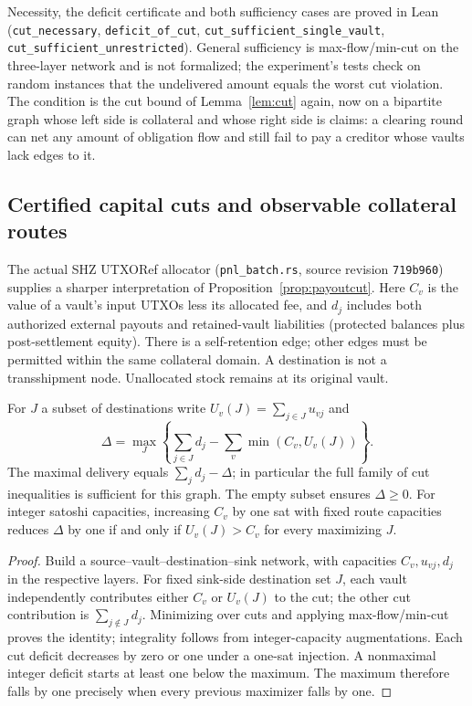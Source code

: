 {\sloppy Necessity, the deficit certificate and both sufficiency cases are proved in Lean (\texttt{cut\_\allowbreak{}necessary}, \texttt{deficit\_\allowbreak{}of\_\allowbreak{}cut}, \texttt{cut\_\allowbreak{}sufficient\_\allowbreak{}single\_\allowbreak{}vault}, \texttt{cut\_\allowbreak{}sufficient\_\allowbreak{}unrestricted}). General sufficiency is max-flow/min-cut \citep{fordfulkerson1956} on the three-layer network and is not formalized; the experiment's tests check on random instances that the undelivered amount equals the worst cut violation. The condition is the cut bound of Lemma~\ref{lem:cut} again, now on a bipartite graph whose left side is collateral and whose right side is claims: a clearing round can net any amount of obligation flow and still fail to pay a creditor whose vaults lack edges to it.\par}

\subsection{Certified capital cuts and observable collateral routes}
\label{sec:rent-cg}

The actual SHZ UTXORef allocator (\texttt{pnl\_batch.rs}, source revision \texttt{719b960}) supplies a sharper interpretation of Proposition~\ref{prop:payoutcut}. Here $C_v$ is the value of a vault's input UTXOs less its allocated fee, and $d_j$ includes both authorized external payouts and retained-vault liabilities (protected balances plus post-settlement equity). There is a self-retention edge; other edges must be permitted within the same collateral domain. A destination is not a transshipment node. Unallocated stock remains at its original vault.

\begin{proposition}
\label{prop:shz-exact-cut}
For $J$ a subset of destinations write $U_v(J)=\sum_{j\in J}u_{vj}$ and
\[
 \Delta=\max_J\left\{\sum_{j\in J}d_j-\sum_v\min(C_v,U_v(J))\right\}.
\]
The maximal delivery equals $\sum_jd_j-\Delta$; in particular the full family of cut inequalities is sufficient for this graph. The empty subset ensures $\Delta\ge0$. For integer satoshi capacities, increasing $C_v$ by one sat with fixed route capacities reduces $\Delta$ by one if and only if $U_v(J)>C_v$ for every maximizing $J$.
\end{proposition}
\begin{proof}
Build a source--vault--destination--sink network, with capacities $C_v,u_{vj},d_j$ in the respective layers. For fixed sink-side destination set $J$, each vault independently contributes either $C_v$ or $U_v(J)$ to the cut; the other cut contribution is $\sum_{j\notin J}d_j$. Minimizing over cuts and applying max-flow/min-cut proves the identity; integrality follows from integer-capacity augmentations. Each cut deficit decreases by zero or one under a one-sat injection. A nonmaximal integer deficit starts at least one below the maximum. The maximum therefore falls by one precisely when every previous maximizer falls by one.
\end{proof}

